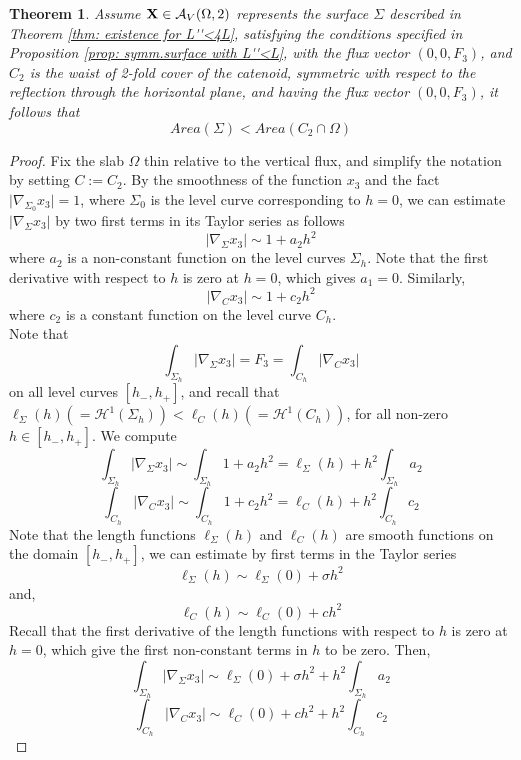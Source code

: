 \documentclass[11pt]{amsart}
\numberwithin{equation}{section}
\theoremstyle{theorem}
\newtheorem{theorem}{Theorem}[section]
\theoremstyle{definition}
\numberwithin{equation}{section}
\begin{document}
\begin{theorem} \label{thm: main result}
    Assume $\bold{X} \in \mathcal{A}_V(\Omega ,2)$ represents the surface $\Sigma$ described in Theorem \ref{thm: existence for L''<4L}, satisfying the conditions specified in Proposition \ref{prop: symm.surface with L''<L}, with the flux vector $(0,0,F_3)$, and $C_2$ is the waist of 2-fold cover of the catenoid, symmetric with respect to the reflection through the horizontal plane, and having the flux vector $(0,0,F_3)$, it follows that
    $$
    Area(\Sigma) < Area (C_2 \cap \Omega)
    $$
\end{theorem}
\begin{proof}
    Fix the slab $\Omega$ thin relative to the vertical flux, and simplify the notation by setting $C:=C_2$. By the smoothness of the function $x_3$ and the fact $\vert \nabla_{\Sigma_0} x_3\vert =1 $, where $\Sigma_0$ is the level curve corresponding to $h=0$, we can estimate $\vert \nabla_{\Sigma} x_3\vert$ by two first terms in its Taylor series as follows
    $$
    \vert \nabla_{\Sigma} x_3\vert \sim 1+a_2h^2
    $$
where $a_2$ is a non-constant function on the level curves $\Sigma_h$. Note that the first derivative with respect to $h$ is zero at $h=0$, which gives $a_1=0$. Similarly,
$$
\vert \nabla_{C} x_3\vert \sim 1+c_2h^2
$$
where $c_2$ is a constant function on the level curve $C_{h}$.\\
    Note that
    $$
    \int_{\Sigma_h} \vert \nabla_{\Sigma}x_3 \vert =F_3= \int_{C_h} \vert \nabla_{C}x_3 \vert 
    $$
    on all level curves $[h_-,h_+]$, and recall that $\ell_{\Sigma}(h)(=\mathcal{H}^1 (\Sigma_h)) < \ell_{C} (h)(=\mathcal{H}^1 (C_h)) $, for all non-zero $h\in [h_-,h_+]$. We compute
    $$
    \int_{\Sigma_h} \vert \nabla_{\Sigma}x_3 \vert \sim \int_{\Sigma_h} 1+a_2h^2 = \ell_{\Sigma}(h) +h^2\int_{\Sigma_h}a_2
    $$
    $$
   \int_{C_h} \vert \nabla_{C}x_3 \vert  \sim \int_{C_h} 1+c_2h^2 = \ell_C(h) +h^2\int_{C_h}c_2
    $$
    Note that the length functions $\ell_{\Sigma}(h)$ and $\ell_C(h)$ are smooth functions on the domain $[h_-,h_+]$, we can estimate by first terms in the Taylor series
$$
\ell_{\Sigma}(h)\sim \ell_{\Sigma}(0) +\sigma h^2
$$
and,
$$
\ell_C(h)\sim \ell_C(0) + ch^2
$$ 
Recall that the first derivative of the length functions with respect to $h$ is zero at $h=0$, which give the first non-constant terms in $h$ to be zero.
 Then,
 $$
  \int_{\Sigma_h} \vert \nabla_{\Sigma}x_3 \vert \sim \ell_{\Sigma}(0) + \sigma h^2+h^2\int_{\Sigma_h}a_2
 $$
 $$
   \int_{C_h} \vert \nabla_{C}x_3 \vert  \sim \ell_C(0) + ch^2 +h^2\int_{C_h}c_2
$$
\end{proof}
\end{document}
